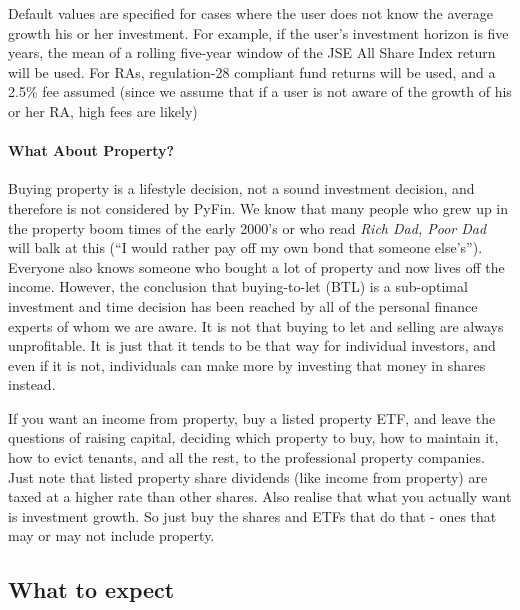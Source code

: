 \documentclass[a4paper, justified]{tufte-handout}
\begin{document}
Default values are specified for cases where the user does not know the average growth his or her investment. For example, if the user's investment horizon is five years, the mean of a rolling five-year window of the JSE All Share Index return will be used. For RAs, regulation-28 compliant fund returns will be used, and a 2.5\% fee assumed (since we assume that if a user is not aware of the growth of his or her RA, high fees are likely)

\paragraph{What About Property?}
Buying property is a lifestyle decision, not a sound investment decision, and therefore is not considered by PyFin. We know that many people who grew up in the property boom times of the early 2000's or who read \textit{Rich Dad, Poor Dad} will balk at this (``I would rather pay off my own bond that someone else's''). Everyone also knows someone who bought a lot of property and now lives off the income. However, the conclusion that buying-to-let (BTL) is a sub-optimal investment and time decision has been reached by all of the personal finance experts of whom we are aware. It is not that buying to let and selling are always unprofitable. It is just that it tends to be that way for individual investors, and even if it is not, individuals can make more by investing that money in shares instead. 

If you want an income from property, buy a listed property ETF, and leave the questions of raising capital, deciding which property to buy, how to maintain it, how to evict tenants, and all the rest, to the professional property companies. Just note that listed property share dividends (like income from property) are taxed at a higher rate than other shares. Also realise that what you actually want is investment growth. So just buy the shares and ETFs that do that - ones that may or may not include property.

\subsection{What to expect}
\end{document}
